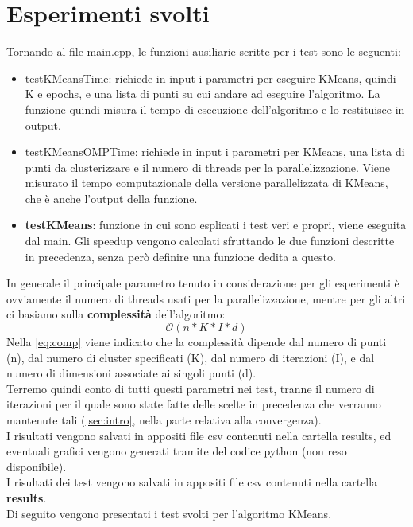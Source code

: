 \documentclass[10pt,twocolumn,letterpaper]{article}
\newcommand{\bit} {\begin{itemize} }
\newcommand{\eit} {\end{itemize} }
\begin{document}
\section{Esperimenti svolti}
\label{sec:exp}
Tornando al file main.cpp, le funzioni ausiliarie scritte per i test sono le seguenti:
\bit
    \item{testKMeansTime: richiede in input i parametri per eseguire KMeans, quindi K e epochs, e una lista di punti su cui andare ad eseguire l'algoritmo. La funzione quindi misura il tempo di esecuzione dell'algoritmo e lo restituisce in output.}
    \item{testKMeansOMPTime: richiede in input i parametri per KMeans, una lista di punti da clusterizzare e il numero di threads per la parallelizzazione. Viene misurato il tempo computazionale della versione parallelizzata di KMeans, che è anche l'output della funzione.}
    \item{\textbf{testKMeans}: funzione in cui sono esplicati i test veri e propri, viene eseguita dal main. Gli speedup vengono calcolati sfruttando le due funzioni descritte in precedenza, senza però definire una funzione dedita a questo.}
\eit
In generale il principale parametro tenuto in considerazione per gli esperimenti è ovviamente il numero di threads usati per la parallelizzazione, mentre per gli altri ci basiamo sulla \textbf{complessità} dell'algoritmo:
\begin{equation}
\label{eq:comp}
    \mathcal{O}(n * K * I * d)
\end{equation}
Nella \cref{eq:comp} viene indicato che la complessità dipende dal numero di punti (n), dal numero di cluster specificati (K), dal numero di iterazioni (I), e dal numero di dimensioni associate ai singoli punti (d).\\
Terremo quindi conto di tutti questi parametri nei test, tranne il numero di iterazioni per il quale sono state fatte delle scelte in precedenza che verranno mantenute tali (\cref{sec:intro}, nella parte relativa alla convergenza).\\
I risultati vengono salvati in appositi file csv contenuti nella cartella results, ed eventuali grafici vengono generati tramite del codice python (non reso disponibile).\\
I risultati dei test vengono salvati in appositi file csv contenuti nella cartella \textbf{results}.\\
Di seguito vengono presentati i test svolti per l'algoritmo KMeans.
\end{document}

